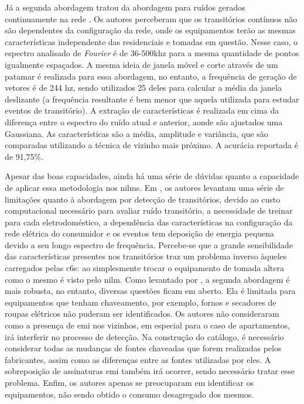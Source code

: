\begin{enumerate}[label=\textbf{2.\arabic*},wide=\parindent]
\begin{itemize}[wide=\parindent]
Já a segunda abordagem tratou da abordagem para ruídos gerados
continuamente na rede \cite{nilm_gupta_patel_2010_30}. Os autores
perceberam que os transitórios contínuos não são dependentes da
configuração da rede, onde os equipamentos terão as mesmas
características independente das residenciais e tomadas em questão.
Nesse caso, o espectro analisado de \emph{Fourier} é de
36-500k\acs{hz} para a mesma quantidade de pontos igualmente
espaçados. A mesma ideia de janela móvel e corte através de um patamar
é realizada para essa abordagem, no entanto, a frequência de geração
de vetores é de 244 \acs{hz}, sendo utilizados 25 deles para
calcular a média da janela deslizante (a frequência resultante é bem
menor que aquela utilizada para estudar eventos de transitório). 
A extração de características é realizada em cima da diferença entre o
espectro do ruído atual e anterior, aonde são ajustados uma Gaussiana.
As características são a média, amplitude e variância, que são
comparadas utilizando a técnica de vizinho mais próximo. A acurácia 
reportada é de 91,75\%.

Apesar das boas capacidades, ainda há uma série de dúvidas quanto a
capacidade de aplicar essa metodologia nos \glspl{nilm}. Em
\cite{nilm_gupta_patel_2010_30}, os autores levantam uma série de
limitações quanto à abordagem por detecção de transitórios, devido ao
custo computacional necessário para avaliar ruído transitório, a
necessidade de treinar para cada eletrodoméstico, a dependência das
características na configuração da rede elétrica do consumidor e os
eventos tem deposição de energia pequena devido a seu longo espectro
de frequência. Percebe-se que a grande sensibilidade das
características presentes nos transitórios traz um problema inverso
àqueles carregados pelas \glspl{c6}: ao simplesmente trocar
o equipamento de tomada altera como o mesmo é visto pelo \gls{nilm}.
Como levantado por \cite{nilm_zeifman_review_2011}, a segunda
abordagem é mais robusta, no entanto, diversas questões ficam em
aberto. Ela é limitada para equipamentos que tenham chaveamento, por
exemplo, fornos e secadores de roupas elétricos não puderam ser
identificados. Os autores não consideraram como a presença de
\gls{emi} nos vizinhos, em especial para o caso de apartamentos, irá
interferir no processo de detecção. Na construção do catálogo, é
necessário considerar todas as mudanças de fontes chaveadas que forem
realizadas pelos fabricantes, assim como as diferenças entre as fontes
utilizadas por eles. A sobreposição de assinaturas \gls{emi} também
irá ocorrer, sendo necessário tratar esse problema. Enfim, os
autores apenas se preocuparam em identificar os equipamentos, não sendo
obtido o consumo desagregado dos mesmos.


\end{itemize}
\end{enumerate}

